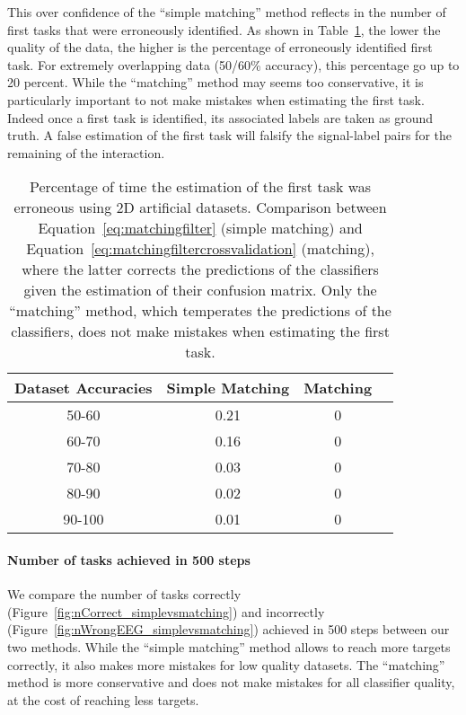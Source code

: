 This over confidence of the ``simple matching'' method reflects in the number of first tasks that were erroneously identified. As shown in Table~\ref{tab:errorTaskRatiosimplevsmatching}, the lower the quality of the data, the higher is the percentage of erroneously identified first task. For extremely overlapping data (50/60\% accuracy), this percentage go up to 20 percent. While the ``matching'' method may seems too conservative, it is particularly important to not make mistakes when estimating the first task. Indeed once a first task is identified, its associated labels are taken as ground truth. A false estimation of the first task will falsify the signal-label pairs for the remaining of the interaction.

\begin{table}[!htbp]
\centering
{}
\begin{tabular}{c c c c}
    Dataset Accuracies & Simple Matching &  Matching \\ \hline
    50-60 & 0.21 & 0 \\ 
    60-70 & 0.16 & 0 \\
    70-80 & 0.03 & 0 \\
    80-90 & 0.02 & 0 \\
    90-100 & 0.01 & 0 \\
\end{tabular}
\caption{Percentage of time the estimation of the first task was erroneous using 2D artificial datasets. Comparison between Equation~\ref{eq:matchingfilter} (simple matching) and Equation~\ref{eq:matchingfiltercrossvalidation} (matching), where the latter corrects the predictions of the classifiers given the estimation of their confusion matrix. Only the ``matching'' method, which temperates the predictions of the classifiers, does not make mistakes when estimating the first task.}
\label{tab:errorTaskRatiosimplevsmatching}
\end{table}

\paragraph{Number of tasks achieved in 500 steps}

We compare the number of tasks correctly (Figure~\ref{fig:nCorrect_simplevsmatching}) and incorrectly (Figure~\ref{fig:nWrongEEG_simplevsmatching}) achieved in 500 steps between our two methods. While the ``simple matching'' method allows to reach more targets correctly, it also makes more mistakes for low quality datasets. The ``matching'' method is more conservative and does not make mistakes for all classifier quality, at the cost of reaching less targets.

